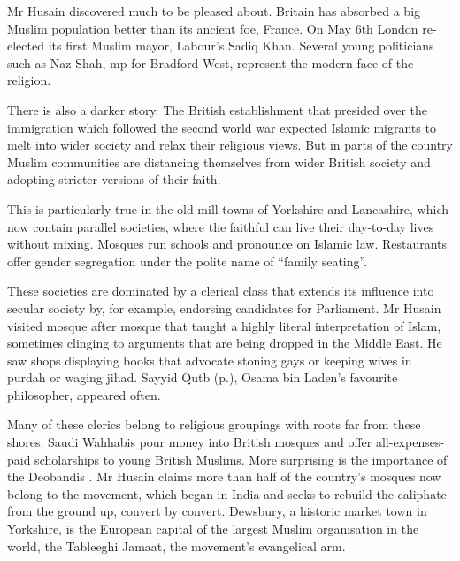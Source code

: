 Mr Husain discovered much to be pleased about. Britain has absorbed a big Muslim population better than its ancient foe, France. On May 6th London re-elected its first Muslim mayor, Labour’s Sadiq Khan. Several young politicians such as Naz Shah, mp for Bradford West, represent the modern face of the religion.

There is also a darker story. The British establishment that presided over the immigration which followed the second world war expected Islamic migrants to melt into wider society and relax their religious views. But in parts of the country Muslim communities are distancing themselves from wider British society and adopting stricter versions of their faith.

This is particularly true in the old mill towns of Yorkshire and Lancashire, which now contain parallel societies, where the faithful can live their day-to-day lives without mixing. Mosques run schools and pronounce on Islamic law. Restaurants offer gender segregation under the polite name of “family seating”.

These societies are dominated by a clerical class that extends its influence into secular society by, for example, endorsing candidates for Parliament. Mr Husain visited mosque after mosque that taught a highly literal interpretation of Islam, sometimes clinging to arguments that are being dropped in the Middle East. He saw shops displaying books that advocate stoning gays or keeping wives in purdah or waging jihad. Sayyid Qutb (p.\pageref{theol:SayyidQutb}), Osama bin Laden’s favourite philosopher, appeared often.

Many of these clerics belong to religious groupings with roots far from these shores. Saudi Wahhabis pour money into British mosques and offer all-expenses-paid scholarships to young British Muslims. More surprising is the importance of the Deobandis . Mr Husain claims more than half of the country’s mosques now belong to the movement, which began in India and seeks to rebuild the caliphate from the ground up, convert by convert. Dewsbury, a historic market town in Yorkshire, is the European capital of the largest Muslim organisation in the world, the Tableeghi Jamaat, the movement’s evangelical arm.


